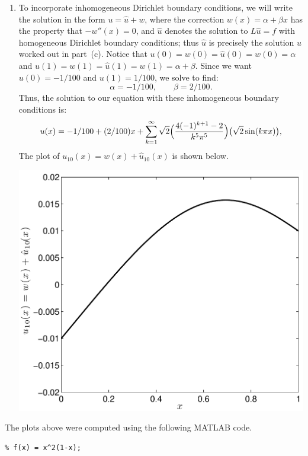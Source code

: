 \begin{solution}
\begin{enumerate}
\item To incorporate inhomogeneous Dirichlet boundary conditions, we will write the 
       solution in the form $u = \widehat{u} + w$, where the correction
       $w(x) = \alpha + \beta x$ has the property that $-w''(x) = 0$, and 
       $\widehat{u}$ denotes the solution to $L\widehat{u} = f$ 
      with homogeneous Dirichlet boundary conditions; thus $\widehat{u}$ is precisely
      the solution $u$ worked out in part~(c).  
      Notice that $u(0) = w(0) = \widehat{u}(0) = w(0) = \alpha$ and 
      $u(1) = w(1) = \widehat{u}(1) = w(1) = \alpha+\beta$.
      Since we want $u(0) = -1/100$ and $u(1) = 1/100$, we solve to find:
         \[ \alpha = -1/100, \qquad \beta = 2/100.\]
      Thus, the solution to our equation with these inhomogeneous boundary conditions is:
               \[ u(x) = -1/100 + (2/100) x 
                        + \sum_{k=1}^\infty \sqrt{2}\Big({4(-1)^{k+1}-2 \over k^5 \pi^5}\Big)
                          \big(\sqrt{2} \sin(k \pi x)\big), \]
      The plot of $u_{10}(x) = w(x) + \widehat{u}_{10}(x)$ is shown below.
\begin{center}\includegraphics[scale=0.7]{sineseries2g}\end{center}
\end{enumerate}

The plots above were computed using the following MATLAB code.

{\small \begin{verbatim}
% f(x) = x^2(1-x);


\end{verbatim}}
\end{solution}
